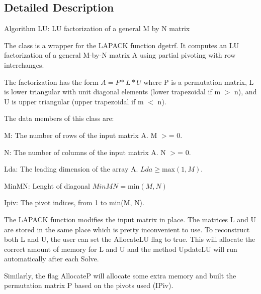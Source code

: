 \subsection{Detailed Description}
Algorithm L\-U\-: L\-U factorization of a general M by N matrix

The class is a wrapper for the L\-A\-P\-A\-C\-K function dgetrf. It computes an L\-U factorization of a general M-\/by-\/\-N matrix A using partial pivoting with row interchanges.

The factorization has the form $ A = P * L * U $ where P is a permutation matrix, L is lower triangular with unit diagonal elements (lower trapezoidal if m $>$ n), and U is upper triangular (upper trapezoidal if m $<$ n).

The data members of this class are\-:


\begin{DoxyItemize}
\item M\-: The number of rows of the input matrix A. M $>$= 0.
\item N\-: The number of columns of the input matrix A. N $>$= 0.
\item Lda\-: The leading dimension of the array A. $ Lda \geq \mbox{max}(1,M) $.
\item Min\-M\-N\-: Lenght of diagonal $ MinMN = \mbox{min}(M,N)$
\item Ipiv\-: The pivot indices, from 1 to min(\-M, N).
\end{DoxyItemize}

The L\-A\-P\-A\-C\-K function modifies the input matrix in place. The matrices L and U are stored in the same place which is pretty inconvenient to use. To reconstruct both L and U, the user can set the Allocate\-L\-U flag to true. This will allocate the correct amount of memory for L and U and the method Update\-L\-U will run automatically after each Solve.

Similarly, the flag Allocate\-P will allocate some extra memory and built the permutation matrix P based on the pivots used (I\-Piv).

